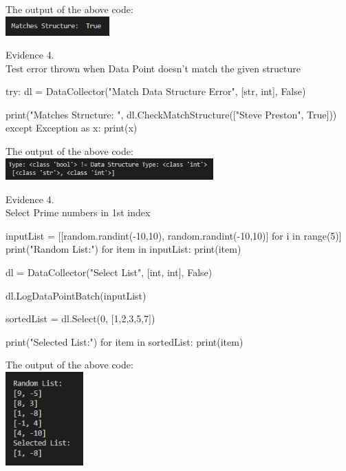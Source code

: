 \begin{center}
    The output of the above code: \\
    \includegraphics[width=4cm]{Images/Testing/T4.5.1.PNG} \\
    \vspace{1cm}

    {\large Evidence 4.\rn } \\ 
    \vspace{0.3cm}
    Test error thrown when Data Point doesn't match the given structure \\

    \begin{pythoncode}
try:
dl = DataCollector("Match Data Structure Error", [str, int], False)

print("Matches Structure: ", dl.CheckMatchStructure(["Steve Preston", True]))
except Exception as x:
print(x)
    \end{pythoncode}

    The output of the above code: \\
    \includegraphics[width=8cm]{Images/Testing/T4.6.1.PNG} \\
    \vspace{1cm}

    {\large Evidence 4.\rn } \\ 
    \vspace{0.3cm}
    Select Prime numbers in 1st index\\

    \begin{pythoncode}
inputList = [[random.randint(-10,10), random.randint(-10,10)] for i in range(5)]
print("Random List:")
for item in inputList:
print(item)

dl = DataCollector("Select List", [int, int], False)

dl.LogDataPointBatch(inputList)

sortedList = dl.Select(0, [1,2,3,5,7])

print("Selected List:")
for item in sortedList:
print(item)
    \end{pythoncode}
        
    The output of the above code: \\
    \includegraphics[width=3cm]{Images/Testing/T4.7.1.PNG} \\
    \vspace{1cm}


\end{center}
